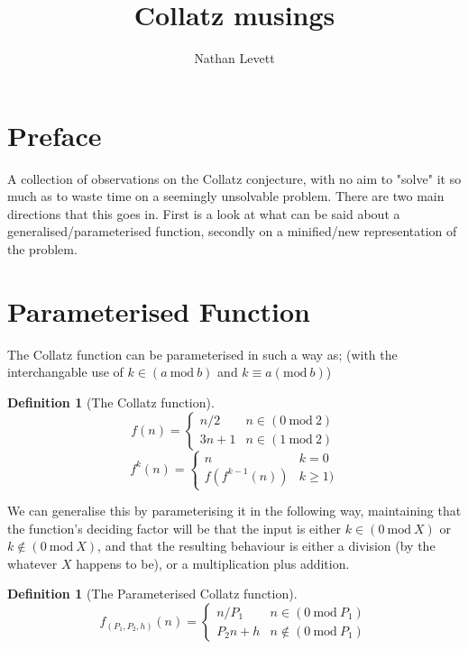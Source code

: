 \documentclass[12pt,a4paper]{amsart}
\author{Nathan Levett}
\title{Collatz musings}
\numberwithin{equation}{section}
\theoremstyle{plain}
\theoremstyle{definition}
\newtheorem{Def}[Th]{Definition}
\begin{document}
	
\tableofcontents

\section{Preface}

A collection of observations on the Collatz conjecture, with no aim to "solve" it so much as to waste time on a seemingly unsolvable problem. There are two main directions that this goes in. First is a look at what can be said about a generalised/parameterised function, secondly on a minified/new representation of the problem.

\section{Parameterised Function}

The Collatz function can be parameterised in such a way as; (with the interchangable use of $k \in \left ( a\:\mathrm{mod}\:b \right )$ and $k \equiv a \left ( \mathrm{mod}\:b \right )$) 

\begin{Def}[The Collatz function]
\begin{equation}
f\left ( n \right )=\left\{\begin{matrix}
n/2  & n \in \left ( 0\:\mathrm{mod}\:2 \right ) \\ 
3n+1 & n \in \left ( 1\:\mathrm{mod}\:2 \right )
\end{matrix}\right.
\end{equation}
\begin{equation}
f^{k}\left ( n \right )=\left\{\begin{matrix}
n & k=0 \\ 
f\left ( f^{k-1}\left ( n \right ) \right ) & k \geq 1 )
\end{matrix}\right.
\end{equation}
\end{Def}

We can generalise this by parameterising it in the following way, maintaining that the function's deciding factor will be that the input is either $k \in \left ( 0\:\mathrm{mod}\:X \right )$ or $k \notin \left ( 0\:\mathrm{mod}\:X \right )$, and that the resulting behaviour is either a division (by the whatever $X$ happens to be), or a multiplication plus addition.

\begin{Def}[The Parameterised Collatz function]
\begin{equation}
f_{\left (P_{1},P_{2},h\right )}\left ( n \right )=\left\{\begin{matrix}
n/P_{1}  & n \in \left ( 0\:\mathrm{mod}\:P_{1} \right ) \\ 
P_{2}n+h & n \notin \left ( 0\:\mathrm{mod}\:P_{1} \right )
\end{matrix}\right.
\end{equation}
\end{Def}
\end{document}
